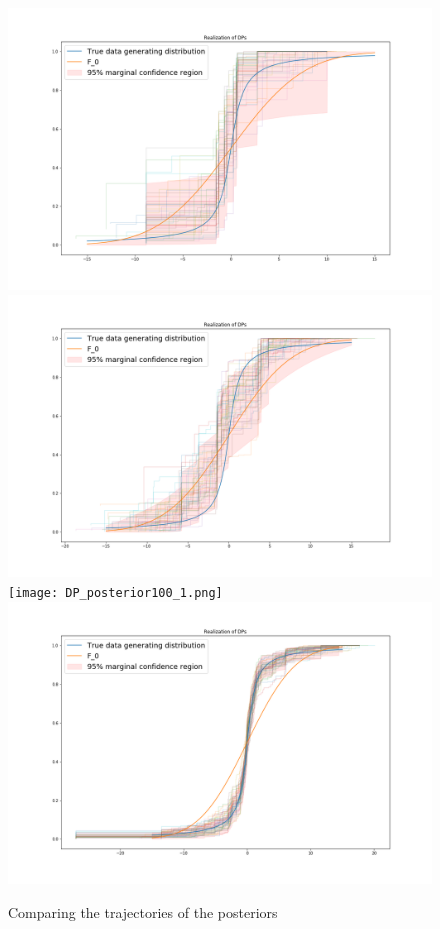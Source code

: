 \documentclass{article}
\begin{document}
\begin{figure}[H]
\label{f2}
\begin{minipage}{1\textwidth}
\includegraphics[width=0.5\linewidth]{DP_posterior10_1.png}\hfill
\includegraphics[width=0.5\linewidth]{DP_posterior10_10.png}\hfill
\texttt{[image: DP\_posterior100\_1.png]}\hfill
\includegraphics[width=0.5\linewidth]{DP_posterior100_10.png}
\end{minipage}
\caption{Comparing the trajectories of the posteriors} 
\end{figure}
\end{document}
